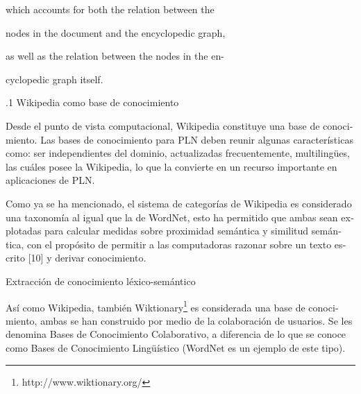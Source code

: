 \documentclass[letterpaper]{article}
\newcommand\textstylebibuscitbase[1]{#1}
\begin{document}
{\sffamily
\textstylebibuscitbase{which accounts for both the relation between the
}}

{\sffamily
\textstylebibuscitbase{nodes in the document and the encyclopedic graph,
}}

{\sffamily
\textstylebibuscitbase{as well as the relation between the nodes in the
en- }}

{\sffamily
\textstylebibuscitbase{cyclopedic graph itself. }}

{.1 Wikipedia como base de conocimiento}


\bigskip

{\sffamily
\textstylebibuscitbase{\foreignlanguage{spanish}{Desde el punto de vista
computacional, Wikipedia constituye una base de conocimiento. Las
}}\textstylebibuscitbase{\foreignlanguage{spanish}{bases de
conocimiento para PLN deben reunir algunas
}}\textstylebibuscitbase{\foreignlanguage{spanish}{caracter\'isticas
como: ser independientes del dominio, actualizadas
}}\textstylebibuscitbase{\foreignlanguage{spanish}{frecuentemente,
multiling\"ues, las cu\'ales posee la
}}\textstylebibuscitbase{\foreignlanguage{spanish}{Wikipedia, lo que la
convierte en un recurso importante en aplicaciones de PLN.}}}


\bigskip

{\sffamily
\textstylebibuscitbase{\foreignlanguage{spanish}{Como ya se ha
mencionado, el sistema de categor\'ias de Wikipedia es considerado una
taxonom\'ia al igual que la de WordNet, esto ha permitido que ambas
sean explotadas para calcular medidas sobre proximidad sem\'antica y
similitud sem\'antica, con el prop\'osito de permitir a las
computadoras razonar sobre un texto escrito [10] y derivar
conocimiento.}}}


\bigskip

{\sffamily
Extracci\'on de conocimiento l\'exico-sem\'antico}


\bigskip

{\sffamily
\textstylebibuscitbase{\foreignlanguage{spanish}{As\'i como Wikipedia,
tambi\'en
Wiktionary}}\footnote{http://www.wiktionary.org/}\textstylebibuscitbase{\foreignlanguage{spanish}{
es considerada una base de conocimiento, ambas se han construido por
medio de la colaboraci\'on de usuarios. Se les denomina Bases de
Conocimiento Colaborativo, a diferencia de lo que se conoce como Bases
de Conocimiento Ling\"u\'istico (WordNet es un ejemplo de este
tipo).}}}
\end{document}
